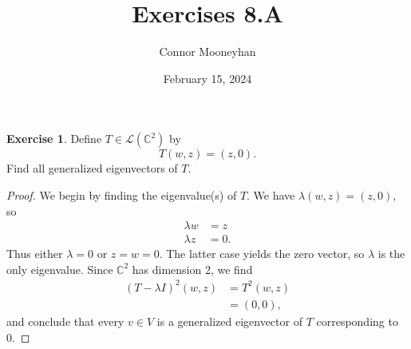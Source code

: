 \documentclass{article}
\title{Exercises 8.A}
\author{Connor Mooneyhan}
\date{February 15, 2024}
\theoremstyle{definition}
\newtheorem{ex}{Exercise}
\begin{document}
\maketitle

\begin{ex}
  Define $T \in \mathcal{L}(\mathbb{C}^2)$ by
  $$T(w, z) = (z, 0).$$
  Find all generalized eigenvectors of $T$.
\end{ex}
\begin{proof}
  We begin by finding the eigenvalue(s) of $T$. We have $\lambda(w, z) = (z, 0)$, so
  \begin{align*}
    \lambda w &= z\\
    \lambda z &= 0.
  \end{align*}
  Thus either $\lambda = 0$ or $z = w = 0$. The latter case yields the zero vector, so $\lambda$ is the only eigenvalue. Since $\mathbb{C}^2$ has dimension 2, we find
  \begin{align*}
    (T - \lambda I)^2(w, z) &= T^2(w, z)\\
    &= (0, 0),
  \end{align*}
  and conclude that every $v \in V$ is a generalized eigenvector of $T$ corresponding to 0.
\end{proof}
\end{document}
